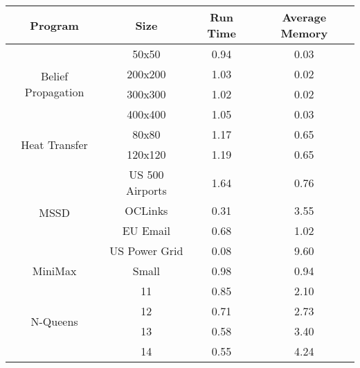 \begin{tabular}{c | c || c | c} \hline
	\textbf{Program} & \textbf{Size} & \textbf{Run Time} & \textbf{Average Memory}\\ \hline \hline
	\multirow{4}{*}{Belief Propagation}  & 50x50 &  0.94  &  0.03
  \\
		 & 200x200 &  1.03  &  0.02
  \\
		 & 300x300 &  1.02  &  0.02
  \\
		 & 400x400 &  1.05  &  0.03
  \\
	\hline
	\multirow{2}{*}{Heat Transfer}  & 80x80 &  1.17  &  0.65
  \\
		 & 120x120 &  1.19  &  0.65
  \\
	\hline
	\multirow{4}{*}{MSSD}  & US 500 Airports &  1.64  &  0.76
  \\
		 & OCLinks &  0.31  &  3.55
  \\
		 & EU Email &  0.68  &  1.02
  \\
		 & US Power Grid &  0.08  &  9.60
  \\
	\hline
	MiniMax  & Small &  0.98  &  0.94
  \\
	\hline
	\multirow{4}{*}{N-Queens}  & 11 &  0.85  &  2.10
  \\
		 & 12 &  0.71  &  2.73
  \\
		 & 13 &  0.58  &  3.40
  \\
		 & 14 &  0.55  &  4.24
  \\
	\hline
\end{tabular}
